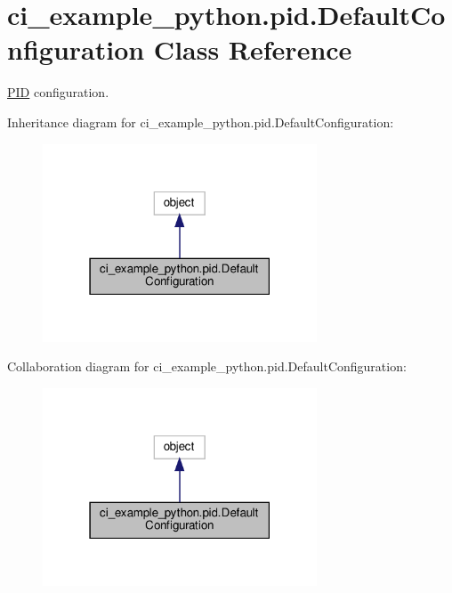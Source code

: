 \hypertarget{classci__example__python_1_1pid_1_1DefaultConfiguration}{}\section{ci\+\_\+example\+\_\+python.\+pid.\+Default\+Configuration Class Reference}
\label{classci__example__python_1_1pid_1_1DefaultConfiguration}


\hyperlink{classci__example__python_1_1pid_1_1PID}{P\+ID} configuration.  




Inheritance diagram for ci\+\_\+example\+\_\+python.\+pid.\+Default\+Configuration\+:
\nopagebreak
\begin{figure}[H]
\begin{center}
\leavevmode
\includegraphics[width=231pt]{classci__example__python_1_1pid_1_1DefaultConfiguration__inherit__graph}
\end{center}
\end{figure}


Collaboration diagram for ci\+\_\+example\+\_\+python.\+pid.\+Default\+Configuration\+:
\nopagebreak
\begin{figure}[H]
\begin{center}
\leavevmode
\includegraphics[width=231pt]{classci__example__python_1_1pid_1_1DefaultConfiguration__coll__graph}
\end{center}
\end{figure}
